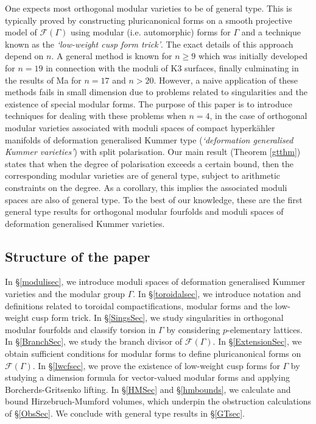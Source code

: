 \documentclass[12pt, a4paper]{article}
\newcommand{\fc}{\mathcal{F}}
\begin{document}
One expects most orthogonal modular varieties to be of general type.
This is typically proved by constructing pluricanonical forms on a smooth projective model of $\fc(\Gamma)$ using modular (i.e. automorphic) forms for $\Gamma$ and a technique known as the \emph{`low-weight cusp form trick'}.
The exact details of this approach depend on $n$.
A general method is known for $n \geq 9$ which was initially developed for $n=19$ \cite{Kondo, GHSK3} in connection with the moduli of K3 surfaces, finally culminating in the results of Ma \cite{Ma} for $n=17$ and $n>20$.
However, a naive application of these methods fails in small dimension due to problems related to singularities and the existence of special modular forms. 
The purpose of this paper is to introduce techniques for dealing with these problems when $n=4$, in the case of orthogonal modular varieties associated with moduli spaces of compact hyperk\"ahler manifolds of deformation generalised Kummer type (\emph{`deformation generalised Kummer varieties'}) with split polarisation.
Our main result (Theorem \ref{gtthm}) states that when the degree of polarisation exceeds a certain bound, then the corresponding modular varieties are of general type, subject to arithmetic constraints on the degree.
As a corollary, this implies the associated moduli spaces are also of general type.
To the best of our knowledge, these are the first general type results for orthogonal modular fourfolds and moduli spaces of deformation generalised Kummer varieties.
\subsection{Structure of the paper}
In \S\ref{modulisec}, we introduce moduli spaces of deformation generalised Kummer varieties and the modular group $\Gamma$.
In \S\ref{toroidalsec}, we introduce notation and definitions related to toroidal compactifications, modular forms and the low-weight cusp form trick.
In \S\ref{SingsSec}, we study singularities in orthogonal modular fourfolds and classify torsion in $\Gamma$ by considering $p$-elementary lattices.
In \S\ref{BranchSec}, we study the branch divisor of $\fc(\Gamma)$.
In \S\ref{ExtensionSec}, we obtain sufficient conditions for modular forms to define pluricanonical forms on $\fc(\Gamma)$.
In \S\ref{lwcfsec}, we prove the existence of low-weight cusp forms for $\Gamma$ by studying a dimension formula for vector-valued modular forms and applying Borcherds-Gritsenko lifting.
In \S\ref{HMSec} and \S\ref{hmbounds}, we calculate and bound Hirzebruch-Mumford volumes, which underpin the obstruction calculations of \S\ref{ObsSec}.
We conclude with general type results in \S\ref{GTsec}.
\end{document}
